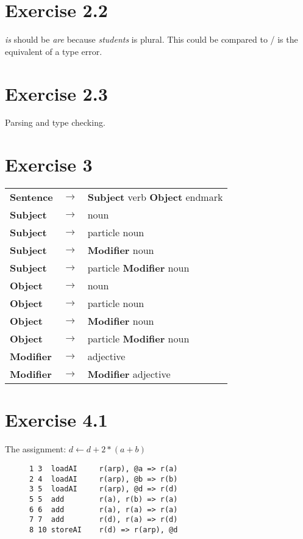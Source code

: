 \documentclass[11pt]{article} %
\begin{document}
\section*{Exercise 2.2}
\textit{is} should be \textit{are} because \textit{students} is plural. This could be compared to / is the equivalent
of a type error.

\section*{Exercise 2.3}
Parsing and type checking.

\section*{Exercise 3}
\begin{tabular}{lcl}
\textbf{Sentence}		& $\rightarrow$	& \textbf{Subject} verb \textbf{Object} endmark		\\
\textbf{Subject}		& $\rightarrow$	& noun												\\
\textbf{Subject}		& $\rightarrow$	& particle noun										\\
\textbf{Subject}		& $\rightarrow$	& \textbf{Modifier} noun							\\
\textbf{Subject}		& $\rightarrow$	& particle \textbf{Modifier} noun					\\
\textbf{Object}			& $\rightarrow$	& noun												\\
\textbf{Object}			& $\rightarrow$	& particle noun										\\
\textbf{Object}			& $\rightarrow$	& \textbf{Modifier} noun							\\
\textbf{Object}			& $\rightarrow$	& particle \textbf{Modifier} noun					\\
\textbf{Modifier}		& $\rightarrow$	& adjective											\\
\textbf{Modifier}		& $\rightarrow$	& \textbf{Modifier} adjective						\\
\end{tabular}

\section*{Exercise 4.1}
The assignment: $d \leftarrow d + 2 * (a + b)$
\begin{figure}[H]
\begin{verbatim}
1 3  loadAI     r(arp), @a => r(a)
2 4  loadAI     r(arp), @b => r(b)
3 5  loadAI     r(arp), @d => r(d)
5 5  add        r(a), r(b) => r(a)
6 6  add        r(a), r(a) => r(a)
7 7  add        r(d), r(a) => r(d)
8 10 storeAI    r(d) => r(arp), @d 
\end{verbatim}
\end{figure}
\end{document}
